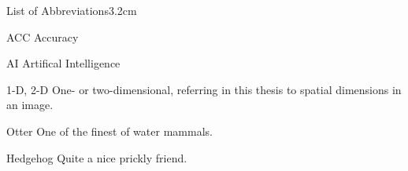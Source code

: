 

\begin{mclistof}{List of Abbreviations}{3.2cm}

 \item[ACC] Accuracy

 \item[AI] Artifical Intelligence

 \item[1-D, 2-D] One- or two-dimensional, referring in this thesis to spatial dimensions in an image.

 \item[Otter] One of the finest of water mammals.

 \item[Hedgehog] Quite a nice prickly friend.

\end{mclistof}
